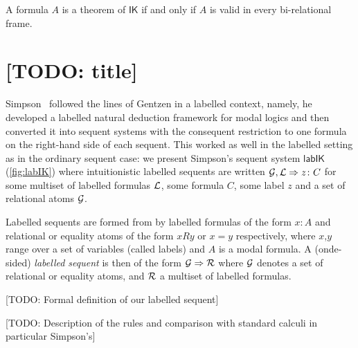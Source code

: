 \documentclass[twoside]{aiml18}
\newcommand{\todo}[1]{{\color{red}[TODO: #1]}}
\newcommand*{\lab}{\mathsf{lab}}
\newcommand*{\IK}{\mathsf{IK}}
\newcommand{\SEQ}{\Rightarrow}
\begin{document}
\begin{theorem}
	A formula $A$ is a theorem of $\IK$ if and only if $A$ is valid in every bi-relational frame.
\end{theorem}


\section{\todo{title}}

Simpson~\cite{Simpson} followed the lines of Gentzen in a labelled context, namely, he developed a labelled natural deduction framework for modal logics and then converted it into sequent systems with the consequent restriction to one formula on the right-hand side of each sequent.
%
This worked as well in the labelled setting as in the ordinary sequent case: we present Simpson's sequent system $\lab\IK$ (\ref{fig:labIK}) where intuitionistic labelled sequents are written $\G, \Left \SEQ z \colon C$ for some multiset of labelled formulas $\mathcal{L}$, some formula $C$, some label $z$ and a set of relational atoms $\mathcal{G}$. 

\begin{definition}
Labelled sequents are formed from by labelled formulas of the form $x \colon A$ and relational or equality atoms of the form $xRy$ or $x = y $ respectively, where $x$,$y$ range over  a set of variables (called labels) and $A$ is a modal formula. A (onde-sided) \emph{labelled sequent} is then of the form $\G \SEQ \Right$ where $\mathcal{G}$ denotes a set of relational or equality atoms, and $\mathcal{R}$ a multiset of labelled formulas.
\end{definition}

\todo{Formal definition of our labelled sequent}

\todo{Description of the rules and comparison with standard calculi in particular Simpson's}
\end{document}
